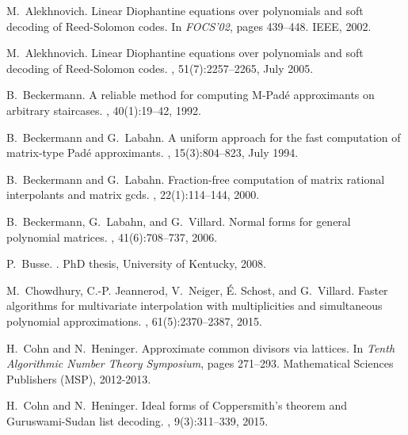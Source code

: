 \documentclass[preprint]{sig-alternate-05-2015}
\begin{document}
\begin{tiny}
\begin{thebibliography}{10}

M.~Alekhnovich.
\newblock Linear {D}iophantine equations over polynomials and soft decoding of
  {R}eed-{S}olomon codes.
\newblock In {\em FOCS'02}, pages 439--448. IEEE, 2002.

M.~Alekhnovich.
\newblock Linear {D}iophantine equations over polynomials and soft decoding of
  {R}eed-{S}olomon codes.
, 51(7):2257--2265, July 2005.

B.~Beckermann.
\newblock A reliable method for computing {M}-{P}ad{\'e} approximants on
  arbitrary staircases.
, 40(1):19--42, 1992.

B.~Beckermann and G.~Labahn.
\newblock A uniform approach for the fast computation of matrix-type {P}ad\'e
  approximants.
, 15(3):804--823, July 1994.

B.~Beckermann and G.~Labahn.
\newblock Fraction-free computation of matrix rational interpolants and matrix
  gcds.
, 22(1):114--144, 2000.

B.~Beckermann, G.~Labahn, and G.~Villard.
\newblock Normal forms for general polynomial matrices.
, 41(6):708--737, 2006.

P.~Busse.
.
\newblock PhD thesis, University of Kentucky, 2008.

M.~Chowdhury, C.-P. Jeannerod, V.~Neiger, \'E. Schost, and G.~Villard.
\newblock Faster algorithms for multivariate interpolation with multiplicities
  and simultaneous polynomial approximations.
, 61(5):2370--2387, 2015.

H.~Cohn and N.~Heninger.
\newblock Approximate common divisors via lattices.
\newblock In {\em Tenth Algorithmic Number Theory Symposium}, pages 271--293.
  Mathematical Sciences Publishers (MSP), 2012-2013.

H.~Cohn and N.~Heninger.
\newblock Ideal forms of {Coppersmith}'s theorem and {Guruswami}-{Sudan} list
  decoding.
, 9(3):311--339, 2015.


\end{thebibliography}
\end{tiny}
\end{document}
